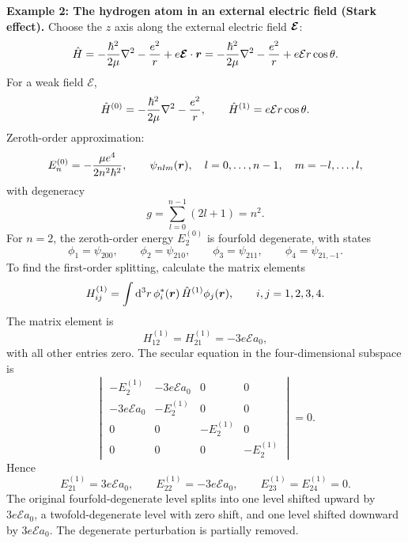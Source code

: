 \textbf{Example 2: The hydrogen atom in an external electric field (Stark effect).}
Choose the $z$ axis along the external electric field $\bm{\mathcal E}$:
\begin{equation}
 \hat{H}=-\frac{\hbar^2}{2\mu}\nabla^2-\frac{e^2}{r}
 +e\bm{\mathcal E}\cdot\bm{r}
 =-\frac{\hbar^2}{2\mu}\nabla^2-\frac{e^2}{r}
 +e\mathcal E r\cos\theta.
\end{equation}
For a weak field $\mathcal E$,
\begin{equation}
 \hat{H}^{(0)}=-\frac{\hbar^2}{2\mu}\nabla^2-\frac{e^2}{r},\qquad
 \hat{H}^{(1)}=e\mathcal E r\cos\theta.
\end{equation}
Zeroth-order approximation:
\begin{equation}
 E_n^{(0)}=-\frac{\mu e^4}{2n^2\hbar^2},\qquad
 \psi_{nlm}(\bm{r}),\quad l=0,\ldots,n-1,\quad m=-l,\ldots,l,
\end{equation}
with degeneracy
\begin{equation}
 g=\sum_{l=0}^{n-1}(2l+1)=n^2.
\end{equation}
For $n=2$, the zeroth-order energy $E_2^{(0)}$ is fourfold degenerate, with states
\begin{equation}
 \phi_1=\psi_{200},\qquad \phi_2=\psi_{210},\qquad
 \phi_3=\psi_{211},\qquad \phi_4=\psi_{21,-1}.
\end{equation}
To find the first-order splitting, calculate the matrix elements
\begin{equation}
 H_{ij}^{(1)}=\int\mathrm{d}^3r\,\phi_i^*(\bm{r})\,
 \hat{H}^{(1)}\phi_j(\bm{r}),\qquad i,j=1,2,3,4.
\end{equation}
The matrix element is
\begin{equation}
 H_{12}^{(1)}=H_{21}^{(1)}=-3e\mathcal E a_0,
\end{equation}
with all other entries zero. The secular equation in the four-dimensional subspace is
\begin{equation}
 \begin{vmatrix}
 -E_2^{(1)}&-3e\mathcal E a_0&0&0\\
 -3e\mathcal E a_0&-E_2^{(1)}&0&0\\
 0&0&-E_2^{(1)}&0\\
 0&0&0&-E_2^{(1)}
 \end{vmatrix}=0.
\end{equation}
Hence
\begin{equation}
 E_{21}^{(1)}=3e\mathcal E a_0,\qquad
 E_{22}^{(1)}=-3e\mathcal E a_0,\qquad
 E_{23}^{(1)}=E_{24}^{(1)}=0.
\end{equation}
The original fourfold-degenerate level splits into one level shifted upward by $3e\mathcal E a_0$, a twofold-degenerate level with zero shift, and one level shifted downward by $3e\mathcal E a_0$. The degenerate perturbation is partially removed.

